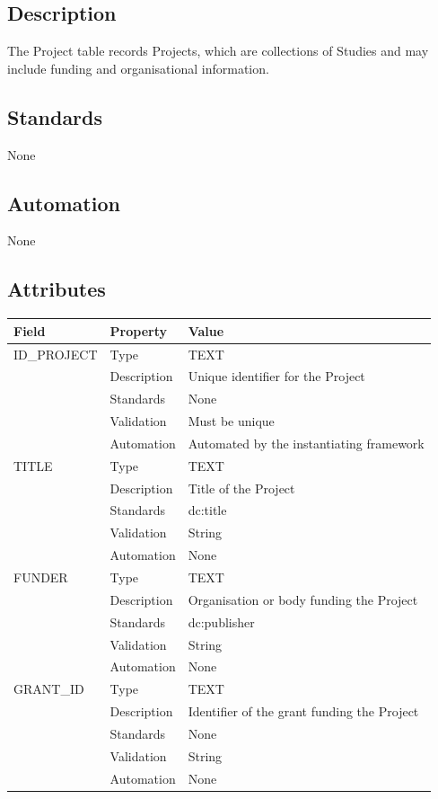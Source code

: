 \subsection{Description}\label{description-25}

The Project table records Projects, which are collections of Studies and
may include funding and organisational information.

\subsection{Standards}\label{standards-27}

None

\subsection{Automation}\label{automation-27}

None

\subsection{Attributes}\label{attributes-24}

\begin{longtable}[]{@{}lll@{}}
\toprule\noalign{}
Field & Property & Value \\
\midrule\noalign{}
\endhead
\bottomrule\noalign{}
\endlastfoot
ID\_PROJECT & Type & TEXT \\
& Description & Unique identifier for the Project \\
& Standards & None \\
& Validation & Must be unique \\
& Automation & Automated by the instantiating framework \\
TITLE & Type & TEXT \\
& Description & Title of the Project \\
& Standards & dc:title \\
& Validation & String \\
& Automation & None \\
FUNDER & Type & TEXT \\
& Description & Organisation or body funding the Project \\
& Standards & dc:publisher \\
& Validation & String \\
& Automation & None \\
GRANT\_ID & Type & TEXT \\
& Description & Identifier of the grant funding the Project \\
& Standards & None \\
& Validation & String \\
& Automation & None \\
\end{longtable}


